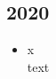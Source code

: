 \subsection{2020}
\begin{history}


    \begin{itemize}

        \item x\\
              text

    \end{itemize}

\end{history}
